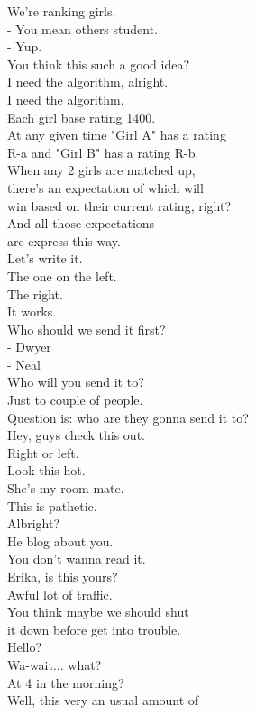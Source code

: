 \documentclass{article}
\begin{document}
\begin{multicols}{3}
We're ranking girls.\\
- You mean others student.\\
- Yup.\\
You think this such a good idea?\\
I need the algorithm, alright.\\
I need the algorithm.\\
Each girl base rating 1400.\\
At any given time "Girl A" has a rating\\
R-a and "Girl B" has a rating R-b.\\
When any 2 girls are matched up,\\
there's an expectation of which will\\
win based on their current rating, right?\\
And all those expectations\\
are express this way.\\
Let's write it.\\
The one on the left.\\
The right.\\
It works.\\
Who should we send it first?\\
- Dwyer\\
- Neal\\
Who will you send it to?\\
Just to couple of people.\\
Question is: who are they gonna send it to?\\
Hey, guys check this out.\\
Right or left.\\
Look this hot.\\
She's my room mate.\\
This is pathetic.\\
Albright?\\
He blog about you.\\
You don't wanna read it.\\
Erika, is this yours?\\
Awful lot of traffic.\\
You think maybe we should shut\\
it down before get into trouble.\\
Hello?\\
Wa-wait... what?\\
At 4 in the morning?\\
Well, this very an usual amount of\\

\end{multicols}
\end{document}
